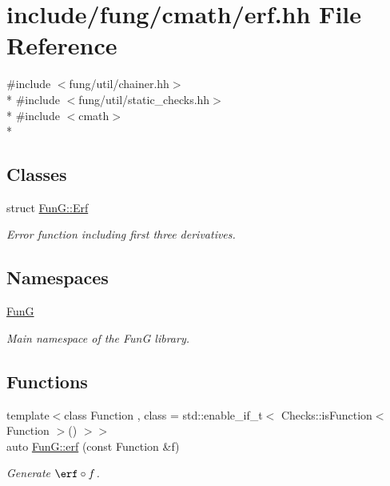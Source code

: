 \hypertarget{erf_8hh}{}\section{include/fung/cmath/erf.hh File Reference}
\label{erf_8hh}
{\ttfamily \#include $<$fung/util/chainer.\+hh$>$}\\*
{\ttfamily \#include $<$fung/util/static\+\_\+checks.\+hh$>$}\\*
{\ttfamily \#include $<$cmath$>$}\\*
\subsection*{Classes}
\begin{DoxyCompactItemize}
\item 
struct \hyperlink{structFunG_1_1Erf}{Fun\+G\+::\+Erf}
\begin{DoxyCompactList}\small\item\em Error function including first three derivatives. \end{DoxyCompactList}\end{DoxyCompactItemize}
\subsection*{Namespaces}
\begin{DoxyCompactItemize}
\item 
 \hyperlink{namespaceFunG}{FunG}
\begin{DoxyCompactList}\small\item\em Main namespace of the FunG library. \end{DoxyCompactList}\end{DoxyCompactItemize}
\subsection*{Functions}
\begin{DoxyCompactItemize}
\item 
{\footnotesize template$<$class Function , class  = std\+::enable\+\_\+if\+\_\+t$<$ Checks\+::is\+Function$<$ Function $>$() $>$$>$ }\\auto \hyperlink{group__CMathGroup_gaa0d608a0906520bd48b7e0036e560afa}{Fun\+G\+::erf} (const Function \&f)
\begin{DoxyCompactList}\small\item\em Generate $ \erf\circ f $. \end{DoxyCompactList}\end{DoxyCompactItemize}
